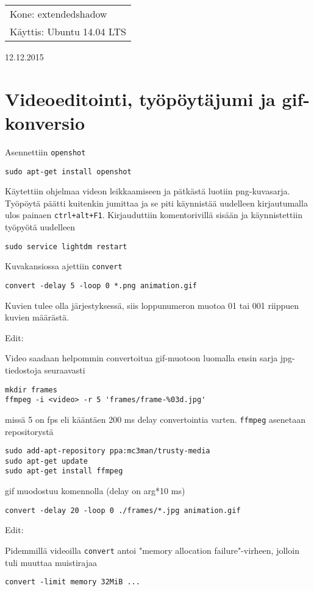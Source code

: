 \documentclass[main.tex]{subfiles}
\begin{document}
\thispagestyle{empty}
\begin{tabular}[t]{l}
Kone: extendedshadow\\
Käyttis: Ubuntu 14.04 LTS
\end{tabular}
\hfill 12.12.2015

{\section{Videoeditointi, työpöytäjumi ja gif-konversio}}

Asennettiin \texttt{openshot}

\begin{lstlisting}
sudo apt-get install openshot
\end{lstlisting}

Käytettiin ohjelmaa videon leikkaamiseen ja pätkästä luotiin png-kuvasarja. Työpöytä päätti kuitenkin jumittaa ja se piti käynnistää uudelleen kirjautumalla ulos painaen \texttt{ctrl+alt+F1}. Kirjauduttiin komentorivillä sisään ja käynnistettiin työpyötä uudelleen

\begin{lstlisting}
sudo service lightdm restart
\end{lstlisting}

Kuvakansiossa ajettiin \texttt{convert}

\begin{lstlisting}
convert -delay 5 -loop 0 *.png animation.gif
\end{lstlisting}

Kuvien tulee olla järjestyksessä, siis loppunumeron muotoa 01 tai 001 riippuen kuvien määrästä.

{\Large{Edit:}}

Video saadaan helpommin convertoitua gif-muotoon luomalla ensin sarja jpg-tiedostoja seuraavasti

\begin{lstlisting}
mkdir frames
ffmpeg -i <video> -r 5 'frames/frame-%03d.jpg'
\end{lstlisting}

missä 5 on fps eli kääntäen 200 ms delay convertointia varten. \texttt{ffmpeg} asenetaan repositorystä

\begin{lstlisting}
sudo add-apt-repository ppa:mc3man/trusty-media
sudo apt-get update
sudo apt-get install ffmpeg
\end{lstlisting}

gif muodostuu komennolla (delay on arg*10 ms)

\begin{lstlisting}
convert -delay 20 -loop 0 ./frames/*.jpg animation.gif
\end{lstlisting}

{\Large{Edit:}}

Pidemmillä videoilla \texttt{convert} antoi "memory allocation failure"-virheen, jolloin tuli muuttaa muistirajaa

\begin{lstlisting}
convert -limit memory 32MiB ...
\end{lstlisting}
\end{document}
